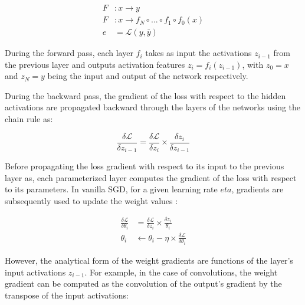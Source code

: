 \documentclass[twocolumn]{bmcart}
\begin{document}
 \begin{subequations}
 	\begin{align}
 	F &: x \rightarrow y \\
 	F &: x \rightarrow f_N \circ ... \circ f_1 \circ f_0(x) \\
 	e &=  \mathcal{L}(y, \bar{y})
 	\end{align}
 \end{subequations}

During the forward pass, each layer $f_i$ takes as input the activations $z_{i-1}$ from the previous layer and outputs activation features $z_i=f_i(z_{i-1})$, with $z_0=x$ and $z_N=y$ being the input and output of the network respectively.

During the backward pass, the gradient of the loss with respect to the hidden activations are propagated backward through the layers of the networks using the chain rule as:


\begin{equation}
\frac{\delta \mathcal{L}}{\delta z_{i-1}} = \frac{\delta \mathcal{L}}{\delta z_{i}}  \times \frac{\delta z_{i}}{\delta z_{i-1}}
\end{equation}

Before propagating the loss gradient with respect to its input to the previous layer as, each parameterized layer computes the gradient of the loss with respect to its parameters. In vanilla SGD, for a given learning rate $eta$, gradients are subsequently used to update the weight values :

\begin{subequations}
\begin{align}
\frac{\delta \mathcal{L}}{\delta \theta_i} & =\frac{\delta \mathcal{L}}{\delta z_{i}}  \times \frac{\delta z_{i}}{\theta_i} \\
\theta_i & \leftarrow \theta_i - \eta \times \frac{\delta \mathcal{L}}{\delta \theta_i}
\end{align}
\end{subequations}

However, the analytical form of the weight gradients are functions of the layer's input activations $z_{i-1}$. For example, in the case of convolutions, the weight gradient can be computed as the convolution of the output's gradient by the transpose of the input activations:
\end{document}
